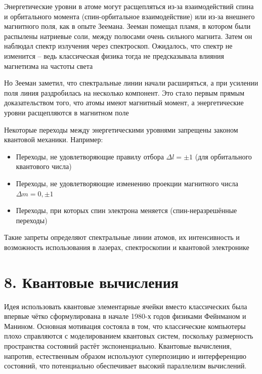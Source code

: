 \documentclass[12pt]{article}
\begin{document}
Энергетические уровни в атоме могут расщепляться из-за взаимодействий спина и орбитального момента (спин-орбитальное взаимодействие) или из-за внешнего магнитного поля, как в опыте Зеемана. Зееман помещал пламя, в котором были распылены натриевые соли, между полюсами очень сильного магнита. Затем он наблюдал спектр излучения через спектроскоп. Ожидалось, что спектр не изменится -- ведь классическая физика тогда не предсказывала влияния магнетизма на частоты света

Но Зееман заметил, что спектральные линии начали расширяться, а при усилении поля линия раздробилась на несколько компонент. Это стало первым прямым доказательством того, что атомы имеют магнитный момент, а энергетические уровни расщепляются в магнитном поле

\smallvspace

Некоторые переходы между энергетическими уровнями запрещены законом квантовой механики. Например:
\begin{itemize}
    \item Переходы, не удовлетворяющие правилу отбора $\Delta l = \pm 1$ (для орбитального квантового числа)
    \item Переходы, не удовлетворяющие изменению проекции магнитного числа $\Delta m = 0, \pm 1$
    \item Переходы, при которых спин электрона меняется (спин-неразрешённые переходы)
\end{itemize}

Такие запреты определяют спектральные линии атомов, их интенсивность и возможность использования в лазерах, спектроскопии и квантовой электронике






\section{8. Квантовые вычисления}

Идея использовать квантовые элементарные ячейки вместо классических была впервые чётко сформулирована в начале 1980-х годов физиками Фейнманом и Манином. Основная мотивация состояла в том, что классические компьютеры плохо справляются с моделированием квантовых систем, поскольку размерность пространства состояний растёт экспоненциально. Квантовые вычисления, напротив, естественным образом используют суперпозицию и интерференцию состояний, что потенциально обеспечивает высокий параллелизм вычислений.
\end{document}
